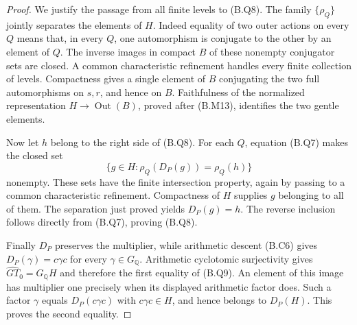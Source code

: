 \begin{proof}
We justify the passage from all finite levels to (B.Q8).
The family $\{\rho_Q\}$ jointly separates the elements of
$H$.  Indeed equality of two outer actions on every $Q$
means that, in every $Q$, one automorphism is conjugate to
the other by an element of $Q$.  The inverse images in
compact $B$ of these nonempty conjugator sets are closed.
A common characteristic refinement handles every finite
collection of levels.  Compactness gives a single element
of $B$ conjugating the two full automorphisms on $s,r$, and
hence on $B$.  Faithfulness of the normalized representation
$H\to\operatorname{Out}(B)$, proved after (B.M13), identifies
the two gentle elements.

Now let $h$ belong to the right side of (B.Q8).  For each
$Q$, equation (B.Q7) makes the closed set
\[
 \{g\in H:\rho_Q(D_P(g))=\rho_Q(h)\}
\]
nonempty.  These sets have the finite intersection property,
again by passing to a common characteristic refinement.
Compactness of $H$ supplies $g$ belonging to all of them.
The separation just proved yields $D_P(g)=h$.  The reverse
inclusion follows directly from (B.Q7), proving (B.Q8).

Finally $D_P$ preserves the multiplier, while arithmetic
descent (B.C6) gives $D_P(\gamma)=c\gamma c$ for every
$\gamma\in G_{\mathbb Q}$.  Arithmetic cyclotomic
surjectivity gives $\widehat{GT}_0=G_{\mathbb Q}H$ and
therefore the first equality of (B.Q9).  An element of this
image has multiplier one precisely when its displayed
arithmetic factor does.  Such a factor $\gamma$ equals
$D_P(c\gamma c)$ with $c\gamma c\in H$, and hence belongs
to $D_P(H)$.  This proves the second equality.
\end{proof}

